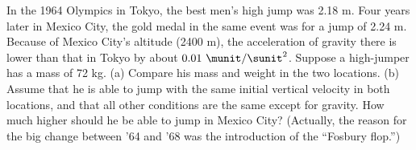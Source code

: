  In the 1964 Olympics in Tokyo, the best men's high jump
was 2.18 m. Four years later in Mexico City, the gold
medal in the same event was for a jump of 2.24 m. Because
of Mexico City's altitude (2400 m), the acceleration of
gravity there is lower than that in Tokyo by about
$0.01\ \munit/\sunit^2$. Suppose a high-jumper has a mass of 72 kg.\hwendpart
(a) Compare his mass and weight in the two locations.\hwendpart
(b) Assume that he is able to jump with the same initial
vertical velocity in both locations, and that all other
conditions are the same except for gravity. How much higher
should he be able to jump in Mexico City?\answercheck\hwendpart
(Actually, the reason for the big change between '64 and '68
was the introduction of the ``Fosbury flop.'')
